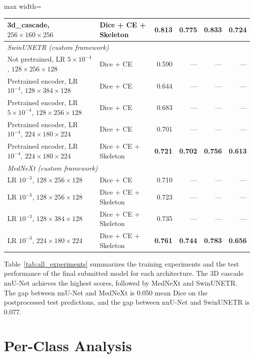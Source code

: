 \begin{table}[H]
\begin{adjustbox}{max width=\textwidth}
\begin{tabular}{llrrrr}
3d\_cascade, $256 \times 160 \times 256$            & Dice + CE + Skeleton  & \textbf{0.813} & \textbf{0.775} & \textbf{0.833} & \textbf{0.724} \\
\midrule
\multicolumn{6}{l}{\textit{SwinUNETR (custom framework)}} \\
\midrule
Not pretrained, LR $5 \times 10^{-4}$, $128 \times 256 \times 128$ & Dice + CE             & 0.590 & --- & --- & --- \\
Pretrained encoder, LR $10^{-4}$, $128 \times 384 \times 128$      & Dice + CE             & 0.644 & --- & --- & --- \\
Pretrained encoder, LR $5 \times 10^{-4}$, $128 \times 256 \times 128$ & Dice + CE         & 0.683 & --- & --- & --- \\
Pretrained encoder, LR $10^{-4}$, $224 \times 180 \times 224$      & Dice + CE             & 0.701 & --- & --- & --- \\
Pretrained encoder, LR $10^{-4}$, $224 \times 180 \times 224$      & Dice + CE + Skeleton  & \textbf{0.721} & \textbf{0.702} & \textbf{0.756} & \textbf{0.613} \\
\midrule
\multicolumn{6}{l}{\textit{MedNeXt (custom framework)}} \\
\midrule
LR $10^{-3}$, $128 \times 256 \times 128$                          & Dice + CE             & 0.710 & --- & --- & --- \\
LR $10^{-3}$, $128 \times 256 \times 128$                          & Dice + CE + Skeleton  & 0.723 & --- & --- & --- \\
LR $10^{-3}$, $128 \times 384 \times 128$                          & Dice + CE + Skeleton  & 0.735 & --- & --- & --- \\
LR $10^{-3}$, $224 \times 180 \times 224$                          & Dice + CE + Skeleton  & \textbf{0.761} & \textbf{0.744} & \textbf{0.783} & \textbf{0.656} \\
\bottomrule
\end{tabular}
\end{adjustbox}
\end{table}

Table~\ref{tab:all_experiments} summarizes the training experiments and the test performance of the final submitted model for each architecture. The 3D cascade nnU-Net achieves the highest scores, followed by MedNeXt and SwinUNETR. The gap between nnU-Net and MedNeXt is 0.050 mean Dice on the postprocessed test predictions, and the gap between nnU-Net and SwinUNETR is 0.077.

\section{Per-Class Analysis}

